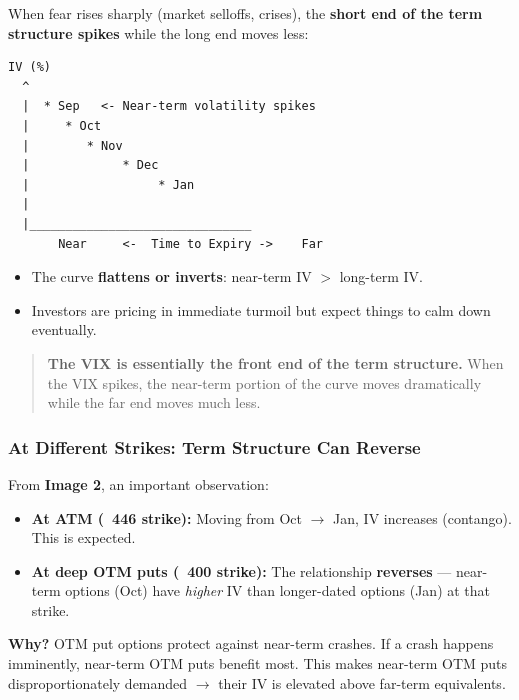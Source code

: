 \documentclass[12pt,openany]{book}
\begin{document}
When fear rises sharply (market selloffs, crises), the \textbf{short end of the term structure spikes} while the long end moves less:

\begin{center}
\begin{Verbatim}[fontsize=\small,breaklines=true]
IV (%)
  ^
  |  * Sep   <- Near-term volatility spikes
  |     * Oct
  |        * Nov
  |             * Dec
  |                  * Jan
  |
  |_______________________________
       Near     <-  Time to Expiry ->    Far
\end{Verbatim}
\end{center}

\begin{itemize}[leftmargin=*]
    \item The curve \textbf{flattens or inverts}: near-term IV \(>\) long-term IV.
    \item Investors are pricing in immediate turmoil but expect things to calm down eventually.
\end{itemize}

\begin{quote}
\textbf{The VIX is essentially the front end of the term structure.} When the VIX spikes, the near-term portion of the curve moves dramatically while the far end moves much less.
\end{quote}

\subsubsection{At Different Strikes: Term Structure Can Reverse}

From \textbf{Image 2}, an important observation:

\begin{itemize}[leftmargin=*]
    \item \textbf{At ATM (~446 strike):} Moving from Oct \(\rightarrow\) Jan, IV increases (contango). This is expected.
    \item \textbf{At deep OTM puts (~400 strike):} The relationship \textbf{reverses} — near-term options (Oct) have \emph{higher} IV than longer-dated options (Jan) at that strike.
\end{itemize}

\textbf{Why?} OTM put options protect against near-term crashes. If a crash happens imminently, near-term OTM puts benefit most. This makes near-term OTM puts disproportionately demanded \(\rightarrow\) their IV is elevated above far-term equivalents.
\end{document}
